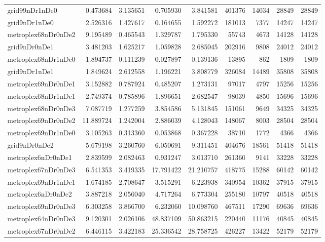 \begin{longtable}{|l|r|r|r|r|r|r|r|r|}
grid99nDr1nDe0 & 0.473684 & 3.135651 & 0.705930 & 3.841581 & 401376 & 14034 & 28849 & 28849 \\
grid9nDr1nDe0 & 2.526316 & 1.427617 & 0.164655 & 1.592272 & 181013 & 7377 & 14247 & 14247 \\
metroplex68nDr0nDe2 & 9.195489 & 0.465543 & 1.329787 & 1.795330 & 55743 & 4673 & 14128 & 14128 \\
grid9nDr0nDe1 & 3.481203 & 1.625217 & 1.059828 & 2.685045 & 202916 & 9808 & 24012 & 24012 \\
metroplex68nDr1nDe0 & 1.894737 & 0.111239 & 0.027897 & 0.139136 & 13895 & 862 & 1809 & 1809 \\
grid9nDr1nDe1 & 1.849624 & 2.612558 & 1.196221 & 3.808779 & 326084 & 14489 & 35808 & 35808 \\
metroplex69nDr0nDe1 & 3.152882 & 0.787924 & 0.485207 & 1.273131 & 97017 & 4797 & 15256 & 15256 \\
metroplex68nDr1nDe1 & 2.749374 & 0.785896 & 1.896651 & 2.682547 & 98039 & 4850 & 15696 & 15696 \\
metroplex68nDr0nDe3 & 7.087719 & 1.277259 & 3.854586 & 5.131845 & 151061 & 9649 & 34325 & 34325 \\
metroplex69nDr0nDe2 & 11.889724 & 1.242004 & 2.886039 & 4.128043 & 148067 & 8003 & 28504 & 28504 \\
metroplex69nDr1nDe0 & 3.105263 & 0.313360 & 0.053868 & 0.367228 & 38710 & 1772 & 4366 & 4366 \\
grid9nDr0nDe2 & 5.679198 & 3.260760 & 6.050691 & 9.311451 & 404676 & 18561 & 51418 & 51418 \\
metroplex6nDr0nDe1 & 2.839599 & 2.082463 & 0.931247 & 3.013710 & 261360 & 9141 & 33228 & 33228 \\
metroplex67nDr0nDe3 & 6.541353 & 3.419335 & 17.791422 & 21.210757 & 418775 & 15288 & 60142 & 60142 \\
metroplex69nDr1nDe1 & 1.674185 & 2.708647 & 3.515291 & 6.223938 & 340954 & 10362 & 37915 & 37915 \\
metroplex6nDr0nDe2 & 3.887218 & 2.056040 & 4.717264 & 6.773304 & 255180 & 10797 & 40518 & 40518 \\
metroplex69nDr0nDe3 & 6.303258 & 3.866700 & 6.232060 & 10.098760 & 467511 & 17290 & 69636 & 69636 \\
metroplex64nDr0nDe3 & 9.120301 & 2.026106 & 48.837109 & 50.863215 & 220440 & 11176 & 40845 & 40845 \\
metroplex67nDr0nDe2 & 6.446115 & 3.422183 & 25.336542 & 28.758725 & 426227 & 13422 & 52179 & 52179 \\

\end{longtable}

